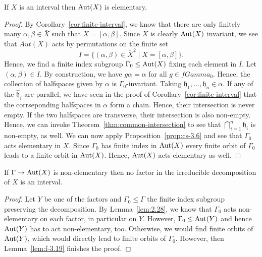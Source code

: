 \begin{lemma}
  \label{lem:f-3.19}
  If \(X\) is an interval then \(\operatorname{Aut}(X)\) is elementary.
\end{lemma}

\begin{proof}
  By Corollary~\ref{cor:finite-interval}, we know that there are only finitely many \(\alpha, \beta \in \bar X\) such that \(X = [\alpha, \beta]\). Since \(X\) is clearly \(\operatorname{Aut}(X)\) invariant, we see that \(Aut(X)\) acts by permutations on the finite set
  \[
    I = \{(\alpha, \beta) \in \bar X^2 \mid X = [\alpha, \beta]\}.
  \]
  Hence, we find a finite index subgroup \(\Gamma_0 \leq \operatorname{Aut}(X)\) fixing each element in \(I\). Let \((\alpha, \beta) \in I\). By construction, we have \(g\alpha = \alpha\) for all \(g \in fGamma_0\). Hence, the collection of halfspaces given by \(\alpha\) is \(\Gamma_0\)-invariant. Taking \(\mathfrak{h}_1, \dots, \mathfrak{h}_n \in \alpha\). If any of the \(\mathfrak{\hat h}_i\) are parallel, we have seen in the proof of Corollary~\ref{cor:finite-interval} that the corrseponding halfspaces in \(\alpha\) form a chain. Hence, their intersection is never empty. If the two halfspaces are transverse, their intersection is also non-empty. Hence, we can invoke Theorem~\ref{thm:common-intersection} to see that \(\bigcap_{i=1}^n \mathfrak{h}_i\) is non-empty, as well. We can now apply Proposition~\ref{prop:cs-3.6} and see that \(\Gamma_0\) acts elementary in \(X\). Since \(\Gamma_0\) has finite index in \(\operatorname{Aut}(X)\) every finite orbit of \(\Gamma_0\) leads to a finite orbit in \(\operatorname{Aut}(X)\). Hence, \(\operatorname{Aut}(X)\) acts elementary as well.
\end{proof}

\begin{cor}
  \label{cor:f-3.21}
  If \(\Gamma \to \operatorname{Aut}(X)\) is non-elementary then no factor in the irreducible decomposition of \(X\) is an interval.
\end{cor}

\begin{proof}
  Let \(Y\) be one of the factors and \(\Gamma_0 \leq \Gamma\) the finite index subgroup preserving the decomposition. By Lemma~\ref{lem:2.28}, we know that \(\Gamma_0\) acts non-elementary on each factor, in particular on \(Y\). However, \(\Gamma_0 \leq \operatorname{Aut}(Y)\) and hence \(\operatorname{Aut}(Y)\) has to act non-elementary, too. Otherwise, we would find finite orbits of \(\operatorname{Aut}(Y)\), which would directly lead to finite orbits of \(\Gamma_0\). However, then Lemma~\ref{lem:f-3.19} finishes the proof.
\end{proof}

